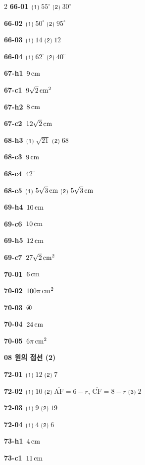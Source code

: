 \documentclass[10pt,a4paper]{article}
\newcommand{\seg}[1]{\overline{\mathrm{#1}}}
\begin{document}
\begin{multicols}{2}
\noindent\textbf{66-01}\ ⑴ $55^\circ$ ⑵ $30^\circ$\par
\noindent\textbf{66-02}\ ⑴ $50^\circ$ ⑵ $95^\circ$\par
\noindent\textbf{66-03}\ ⑴ $14$ ⑵ $12$\par
\noindent\textbf{66-04}\ ⑴ $62^\circ$ ⑵ $40^\circ$\par
\noindent\textbf{67-h1}\ $9\mkern3mu \mathrm{cm}$\par
\noindent\textbf{67-c1}\ $9\sqrt{2}\mkern3mu \mathrm{cm}^2$\par
\noindent\textbf{67-h2}\ $8\mkern3mu \mathrm{cm}$\par
\noindent\textbf{67-c2}\ $12\sqrt{2}\mkern3mu \mathrm{cm}$\par
\noindent\textbf{68-h3}\ ⑴ $\sqrt{21}$ ⑵ $68$\par
\noindent\textbf{68-c3}\ $9\mkern3mu \mathrm{cm}$\par
\noindent\textbf{68-c4}\ $42^\circ$\par
\noindent\textbf{68-c5}\ ⑴ $5\sqrt{3}\mkern3mu \mathrm{cm}$ ⑵ $5\sqrt{3}\mkern3mu \mathrm{cm}$\par
\noindent\textbf{69-h4}\ $10\mkern3mu \mathrm{cm}$\par
\noindent\textbf{69-c6}\ $10\mkern3mu \mathrm{cm}$\par
\noindent\textbf{69-h5}\ $12\mkern3mu \mathrm{cm}$\par
\noindent\textbf{69-c7}\ $27\sqrt{2}\mkern3mu \mathrm{cm}^2$\par
\noindent\textbf{70-01}\ $6\mkern3mu \mathrm{cm}$\par
\noindent\textbf{70-02}\ $100\pi\mkern3mu \mathrm{cm}^2$\par
\noindent\textbf{70-03}\ ④\par
\noindent\textbf{70-04}\ $24\mkern3mu \mathrm{cm}$\par
\noindent\textbf{70-05}\ $6\pi\mkern3mu \mathrm{cm}^2$\par
\noindent\textbf{08 원의 접선 (2)}\par\smallskip
\noindent\textbf{72-01}\ ⑴ $12$ ⑵ $7$\par
\noindent\textbf{72-02}\ ⑴ $10$ ⑵ $\seg{AF}=6-r$, $\seg{CF}=8-r$ ⑶ $2$\par
\noindent\textbf{72-03}\ ⑴ $9$ ⑵ $19$\par
\noindent\textbf{72-04}\ ⑴ $4$ ⑵ $6$\par
\noindent\textbf{73-h1}\ $4\mkern3mu \mathrm{cm}$\par
\noindent\textbf{73-c1}\ $11\mkern3mu \mathrm{cm}$\par

\end{multicols}
\end{document}
